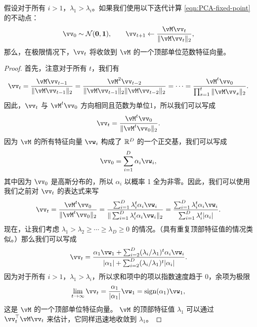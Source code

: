 \documentclass[../../book-main.tex]{subfiles}
\begin{document}
\begin{theorem}[幂迭代法]
假设对于所有 \(i > 1\)，\(\lambda_{1} > \lambda_{i}\)。如果我们使用以下迭代计算 \eqref{eqn:PCA-fixed-point} 的不动点：
\begin{equation}\label{eq:power_iteration}
    \vv_{0} \sim \dNorm(\vzero, \vone), \qquad \vv_{t + 1} \gets \frac{\vM\vv_{t}}{\norm{\vM\vv_{t}}_{2}},
\end{equation}
那么，在极限情况下，\(\vv_{t}\) 将收敛到 \(\vM\) 的一个顶部单位范数特征向量。
\end{theorem}

\begin{proof} 首先，注意对于所有 \(t\)，我们有
\begin{equation}
    \vv_{t} = \frac{\vM\vv_{t - 1}}{\norm{\vM\vv_{t - 1}}_{2}} = \frac{\vM^{2}\vv_{t - 2}}{\norm{\vM\vv_{t - 1}}_{2}\norm{\vM\vv_{t - 2}}_{2}} = \cdots = \frac{\vM^{t}\vv_{0}}{\prod_{s = 1}^{t}\norm{\vM\vv_{s}}_{2}}.
\end{equation}
因此，\(\vv_{t}\) 与 \(\vM^{t}\vv_{0}\) 方向相同且范数为单位1，所以我们可以写成
\begin{equation}
    \vv_{t} = \frac{\vM^{t}\vv_{0}}{\norm{\vM^{t}\vv_{0}}_{2}}.
\end{equation}
因为 $\vM$ 的所有特征向量 \(\vw_{i}\) 构成了 \(\mathbb{R}^{D}\) 的一个正交基，我们可以写成
\begin{equation}
    \vv_{0} = \sum_{i = 1}^{D}\alpha_{i}\vw_{i},
\end{equation}
其中因为 \(\vv_{0}\) 是高斯分布的，所以 \(\alpha_{i}\) 以概率 1 全为非零。因此，我们可以使用我们之前对 \(\vv_{t}\) 的表达式来写
\begin{equation}
    \vv_{t} = \frac{\vM^{t}\vv_{0}}{\norm{\vM^{t}\vv_{0}}_{2}} = \frac{\sum_{i = 1}^{D}\lambda_{i}^{t}\alpha_{i}\vw_{i}}{\norm{\sum_{i = 1}^{D}\lambda_{i}^{t}\alpha_{i}\vw_{i}}_{2}} = \frac{\sum_{i = 1}^{D}\lambda_{i}^{t}\alpha_{i}\vw_{i}}{\sum_{i = 1}^{D}\lambda_{i}^{t}\abs{\alpha_{i}}}. 
\end{equation}
现在，让我们考虑 \(\lambda_{1} > \lambda_{2} \geq \cdots \geq \lambda_{D} \geq 0\) 的情况。（具有重复顶部特征值的情况类似。）那么我们可以写成
\begin{equation}
    \vv_{t} = \frac{\alpha_{1}\vw_{1} + \sum_{i = 2}^{D}(\lambda_{i}/\lambda_{1})^{t}\alpha_{i}\vw_{i}}{\abs{\alpha_{1}} + \sum_{i = 2}^{D}(\lambda_{i}/\lambda_{1})^{t}\abs{\alpha_{i}}}.
\end{equation}
因为对于所有 \(i > 1\)，\(\lambda_{1} > \lambda_{i}\)，所以求和项中的项以指数速度趋于 0，余项为极限
\begin{equation}
    \lim_{t \to \infty}\vv_{t} = \frac{\alpha_{1}}{\abs{\alpha_{1}}}\vw_{1} = \sign(\alpha_{1})\vw_{1},
\end{equation}
这是 \(\vM\) 的一个顶部单位特征向量。 \(\vM\) 的顶部特征值 \(\lambda_{1}\) 可以通过 \(\vv_{t}^{\top}\vM\vv_{t}\) 来估计，它同样迅速地收敛到 \(\lambda_{1}\)。
\end{proof}
\end{document}
